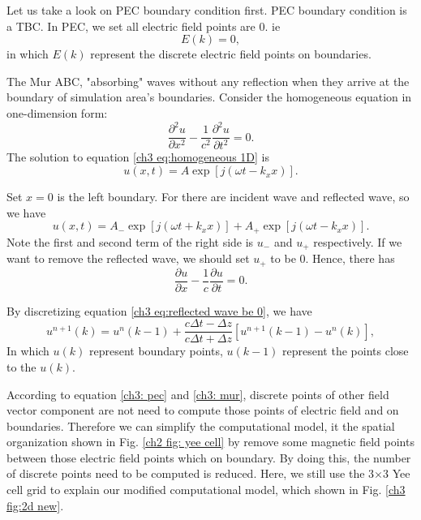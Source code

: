 Let us take a look on PEC boundary condition first. PEC boundary condition is a TBC. In PEC, we set all electric field points are 0. ie
\begin{equation}\label{ch3: pec}
E(k)=0,
\end{equation}
in which $E(k)$ represent the discrete electric field points on boundaries.

The Mur ABC, "absorbing" waves without any reflection when they arrive at the boundary of simulation area's boundaries. Consider the homogeneous equation in one-dimension form:
\begin{equation}
\frac{\partial^2 u}{\partial x^2}-\frac{1}{c^2}\frac{\partial^2 u}{\partial t^2}=0.
\end{equation}\label{ch3 eq:homogeneous 1D}
The solution to equation \eqref{ch3 eq:homogeneous 1D} is
\begin{equation}
u(x,t)=A\exp[j(\omega t-k_x x)].
\end{equation}

Set $x=0$ is the left boundary. For there are incident wave and reflected wave, so we have
\begin{equation}
u(x,t)=A_{-}\exp[j(\omega t+k_x x)]+A_{+}\exp[j(\omega t-k_x x)].
\end{equation}
Note the first and second term of the right side is $u_{-}$ and $u_{+}$ respectively. If we want to remove the reflected wave, we should set $u_{+}$  to be 0. Hence, there has
\begin{equation}
\frac{\partial u}{\partial x}-\frac{1}{c}\frac{\partial u}{\partial t}=0.
\end{equation}\label{ch3 eq:reflected wave be 0}

By discretizing equation \eqref{ch3 eq:reflected wave be 0}, we have
\begin{equation}\label{ch3: mur}
u^{n+1}(k)=u^n(k-1)+\frac{c\Delta t-\Delta z}{c\Delta t+\Delta z}[u^{n+1}(k-1)-u^n(k)],
\end{equation}
In which $u(k)$ represent boundary points, $u(k-1)$ represent the points close to the $u(k)$.

According to equation \eqref{ch3: pec} and \eqref{ch3: mur}, discrete points of other field vector component are not need to compute those points of electric field and on boundaries. Therefore we can simplify the computational model, it the spatial organization shown in Fig. \ref{ch2 fig: yee cell} by remove some magnetic field points between those electric field points which on boundary. By doing this, the number of discrete points need to be computed is reduced. Here, we still use the 3$\times$3 Yee cell grid to explain our modified computational model, which shown in Fig. \ref{ch3 fig:2d new}.

